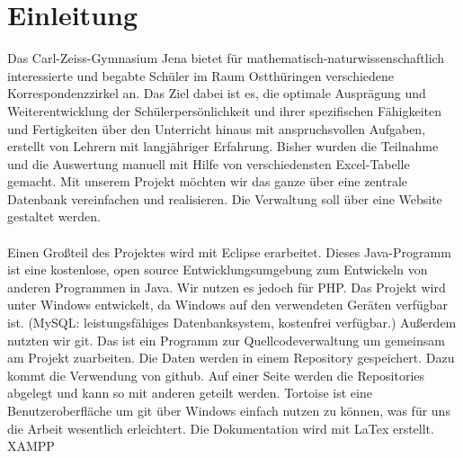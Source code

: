 \chapter{Einleitung}
Das Carl-Zeiss-Gymnasium Jena bietet für mathematisch-naturwissenschaftlich interessierte und begabte Schüler im Raum Ostthüringen verschiedene Korrespondenzzirkel an. Das Ziel dabei ist es, die optimale Ausprägung und Weiterentwicklung der Schülerpersönlichkeit und ihrer spezifischen Fähigkeiten und  Fertigkeiten über den Unterricht hinaus mit anspruchsvollen Aufgaben, erstellt von Lehrern mit langjähriger Erfahrung. Bisher wurden die Teilnahme und die Auswertung  manuell mit Hilfe von verschiedensten Excel-Tabelle gemacht. Mit unserem Projekt möchten wir das ganze über eine zentrale Datenbank vereinfachen und realisieren. Die Verwaltung soll über eine Website gestaltet werden.\\
\\
Einen Großteil des Projektes wird mit Eclipse erarbeitet. Dieses Java-Programm ist eine kostenlose, open source Entwicklungsumgebung zum Entwickeln von anderen Programmen in Java. Wir nutzen es jedoch für PHP. Das Projekt wird unter Windows entwickelt, da Windows auf den verwendeten Geräten verfügbar ist. (MySQL: leistungsfähiges Datenbanksystem, kostenfrei verfügbar.) Außerdem nutzten wir git. Das ist ein Programm zur Quellcodeverwaltung um gemeinsam am Projekt zuarbeiten. Die Daten werden in einem Repository gespeichert. Dazu kommt die Verwendung von github. Auf einer Seite werden die Repositories abgelegt und kann so mit anderen geteilt werden. Tortoise ist eine Benutzeroberfläche um git über Windows einfach nutzen zu können, was für uns die Arbeit wesentlich erleichtert. Die Dokumentation wird mit LaTex erstellt.
\\
XAMPP
